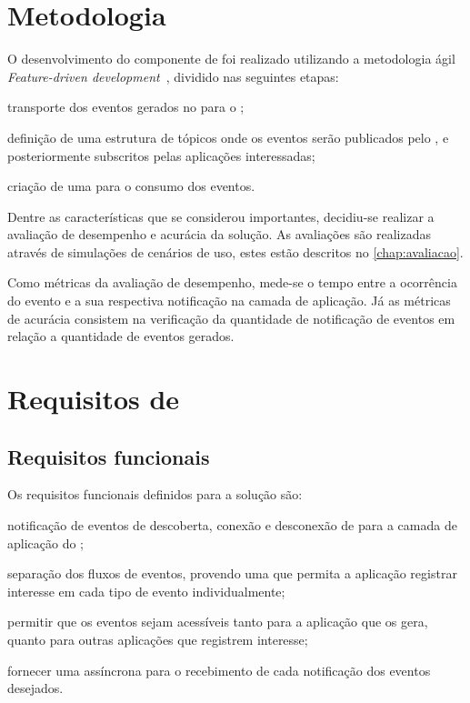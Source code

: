 \section{Metodologia} \label{sec:metodologia}

O desenvolvimento do componente de \software foi realizado utilizando a metodologia ágil \textit{Feature-driven development}~\cite{coad:luca:lefebvre:1999}, dividido nas seguintes etapas:

\begin{alineas}
	\item transporte dos eventos gerados no \stwopa para o \cddl;

	\item definição de uma estrutura de tópicos onde os eventos serão publicados pelo \cddl, e posteriormente subscritos pelas aplicações interessadas;

	\item criação de uma \api para o consumo dos eventos.
\end{alineas}

Dentre as características que se considerou importantes, decidiu-se realizar a avaliação de desempenho e acurácia da solução.
As avaliações são realizadas através de simulações de cenários de uso, estes estão descritos no \autoref{chap:avaliacao}.

Como métricas da avaliação de desempenho, mede-se o tempo entre a ocorrência do evento e a sua respectiva notificação na camada de aplicação. Já as métricas de acurácia consistem na verificação da quantidade de notificação de eventos em relação a quantidade de eventos gerados.

\section{Requisitos de \software}

\subsection*{Requisitos funcionais}

Os requisitos funcionais definidos para a solução são:

\begin{alineas}
	\item notificação de eventos de descoberta, conexão e desconexão de \smartobjs para a camada de aplicação do \software;

	\item separação dos fluxos de eventos, provendo uma \api que permita a aplicação registrar interesse em cada tipo de evento individualmente;

	\item permitir que os eventos sejam acessíveis tanto para a aplicação que os gera, quanto para outras aplicações que registrem interesse;

	\item fornecer uma \api assíncrona para o recebimento de cada notificação dos eventos desejados.
\end{alineas}

